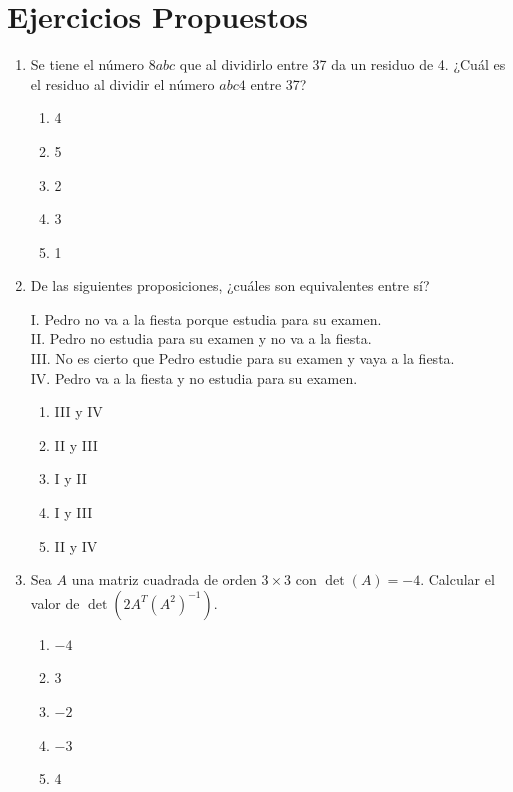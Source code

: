 \newpage

\section*{Ejercicios Propuestos}


\begin{enumerate}
	
	\item Se tiene el número $8abc$ que al dividirlo entre 37 da un residuo de 4. ¿Cuál es el residuo al dividir el número $abc4$ entre 37?
	\begin{enumerate}[label=\alph*)]
		\item 4
		\item 5
		\item 2
		\item 3
		\item 1
	\end{enumerate}
	
	\item De las siguientes proposiciones, ¿cuáles son equivalentes entre sí?
	
	I. Pedro no va a la fiesta porque estudia para su examen.\\
	II. Pedro no estudia para su examen y no va a la fiesta.\\
	III. No es cierto que Pedro estudie para su examen y vaya a la fiesta.\\
	IV. Pedro va a la fiesta y no estudia para su examen.
	
	\begin{enumerate}[label=\alph*)]
		\item III y IV
		\item II y III
		\item I y II
		\item I y III
		\item II y IV
	\end{enumerate}
	
	\item Sea $A$ una matriz cuadrada de orden $3\times 3$ con $\det(A)=-4$. Calcular el valor de $\det(2A^T(A^2)^{-1})$.
	\begin{enumerate}[label=\alph*)]
		\item $-4$
		\item 3
		\item $-2$
		\item $-3$
		\item 4
	\end{enumerate}
	

\end{enumerate}
